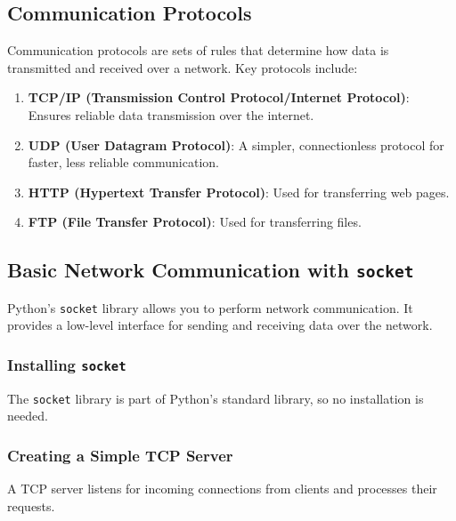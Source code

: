 \documentclass[
  letterpaper,
  DIV=11,
  numbers=noendperiod]{scrreprt}
\providecommand{\tightlist}{%
  \setlength{\itemsep}{0pt}\setlength{\parskip}{0pt}}\usepackage{longtable,booktabs,array}
\begin{document}
\subsection{Communication Protocols}\label{communication-protocols}

Communication protocols are sets of rules that determine how data is
transmitted and received over a network. Key protocols include:

\begin{enumerate}
\def\labelenumi{\arabic{enumi}.}
\tightlist
\item
  \textbf{TCP/IP (Transmission Control Protocol/Internet Protocol)}:
  Ensures reliable data transmission over the internet.
\item
  \textbf{UDP (User Datagram Protocol)}: A simpler, connectionless
  protocol for faster, less reliable communication.
\item
  \textbf{HTTP (Hypertext Transfer Protocol)}: Used for transferring web
  pages.
\item
  \textbf{FTP (File Transfer Protocol)}: Used for transferring files.
\end{enumerate}

\subsection{\texorpdfstring{Basic Network Communication with
\texttt{socket}}{Basic Network Communication with socket}}\label{basic-network-communication-with-socket}

Python's \texttt{socket} library allows you to perform network
communication. It provides a low-level interface for sending and
receiving data over the network.

\subsubsection{\texorpdfstring{Installing
\texttt{socket}}{Installing socket}}\label{installing-socket}

The \texttt{socket} library is part of Python's standard library, so no
installation is needed.

\subsubsection{Creating a Simple TCP
Server}\label{creating-a-simple-tcp-server}

A TCP server listens for incoming connections from clients and processes
their requests.
\end{document}
